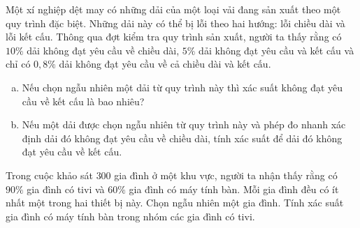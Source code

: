 \begin{bt}%
	Một xí nghiệp dệt may có những dải của một loại vải đang sản xuất theo một quy trình đặc biệt. Những dải này có thể bị lỗi theo hai hướng: lỗi chiều dài và lỗi kết cấu. Thông qua đợt kiểm tra quy trình sản xuất, người ta thấy rằng có $10\%$ dải không đạt yêu cầu về chiều dài, $5\%$ dải không đạt yêu cầu và kết cấu và chỉ có $0{,}8\%$ dải không đạt yêu cầu về cả chiều dài và kết cấu.
	\begin{enumerate}[a)]
		\item Nếu chọn ngẫu nhiên một dải từ quy trình này thì xác suất không đạt yêu cầu về kết cấu là bao nhiêu?
		\item Nếu một dải được chọn ngẫu nhiên từ quy trình này và phép đo nhanh xác định dải đó không đạt yêu cầu về chiều dài, tính xác suất để dải đó không đạt yêu cầu về kết cấu.
	\end{enumerate}
\end{bt}

\begin{bt}%
	Trong cuộc khảo sát $300$ gia đình ở một khu vực, người ta nhận thấy rằng có $90\%$ gia đình có tivi và $60\%$ gia đình có máy tính bàn. Mỗi gia đình đều có ít nhất một trong hai thiết bị này. Chọn ngẫu nhiên một gia đình. Tính xác suất gia đình có máy tính bàn trong nhóm các gia đình có tivi. 	
\end{bt}

